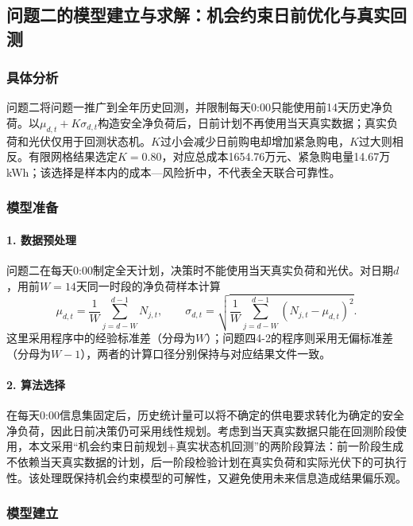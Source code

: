 \documentclass{cumcmthesis}
\begin{document}
\subsection{问题二的模型建立与求解：机会约束日前优化与真实回测}

\subsubsection{具体分析}

问题二将问题一推广到全年历史回测，并限制每天0:00只能使用前14天历史净负荷。以$\mu_{d,t}+K\sigma_{d,t}$构造安全净负荷后，日前计划不再使用当天真实数据；真实负荷和光伏仅用于回测状态机。$K$过小会减少日前购电却增加紧急购电，$K$过大则相反。有限网格结果选定$K=0.80$，对应总成本1654.76万元、紧急购电量14.67万kWh；该选择是样本内的成本—风险折中，不代表全天联合可靠性。

\subsubsection{模型准备}

\paragraph{1. 数据预处理}

问题二在每天0:00制定全天计划，决策时不能使用当天真实负荷和光伏。对日期$d$，用前$W=14$天同一时段的净负荷样本计算
\begin{equation}
\mu_{d,t}=\frac{1}{W}\sum_{j=d-W}^{d-1}N_{j,t},\qquad
\sigma_{d,t}=\sqrt{\frac{1}{W}\sum_{j=d-W}^{d-1}(N_{j,t}-\mu_{d,t})^2}.
\tag{10}
\end{equation}
这里采用程序中的经验标准差（分母为$W$）；问题四4-2的程序则采用无偏标准差（分母为$W-1$），两者的计算口径分别保持与对应结果文件一致。

\paragraph{2. 算法选择}

在每天0:00信息集固定后，历史统计量可以将不确定的供电要求转化为确定的安全净负荷，因此日前决策仍可采用线性规划。考虑到当天真实数据只能在回测阶段使用，本文采用“机会约束日前规划+真实状态机回测”的两阶段算法：前一阶段生成不依赖当天真实数据的计划，后一阶段检验计划在真实负荷和实际光伏下的可执行性。该处理既保持机会约束模型的可解性，又避免使用未来信息造成结果偏乐观。

\subsubsection{模型建立}
\end{document}
